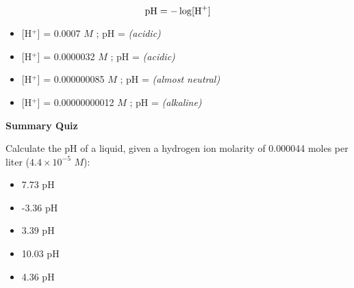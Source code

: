 





$$\hbox{pH} = - \log [\hbox{H}^{+}]$$


\begin{itemize}
\item{} [H$^{+}$] = 0.0007 $M$ ; pH =  {\it (acidic)}
\vskip 5pt
\item{} [H$^{+}$] = 0.0000032 $M$ ; pH =  {\it (acidic)}
\vskip 5pt
\item{} [H$^{+}$] = 0.000000085 $M$ ; pH =  {\it (almost neutral)}
\vskip 5pt
\item{} [H$^{+}$] = 0.00000000012 $M$ ; pH =  {\it (alkaline)}
\end{itemize}








\vfil \eject

\noindent
{\bf Summary Quiz}

Calculate the pH of a liquid, given a hydrogen ion molarity of 0.000044 moles per liter ($4.4 \times 10^{-5}$ $M$):

\begin{itemize}
\item{} 7.73 pH
\vskip 5pt
\item{} -3.36 pH
\vskip 5pt
\item{} 3.39 pH
\vskip 5pt
\item{} 10.03 pH
\vskip 5pt
\item{} 4.36 pH
\end{itemize}





